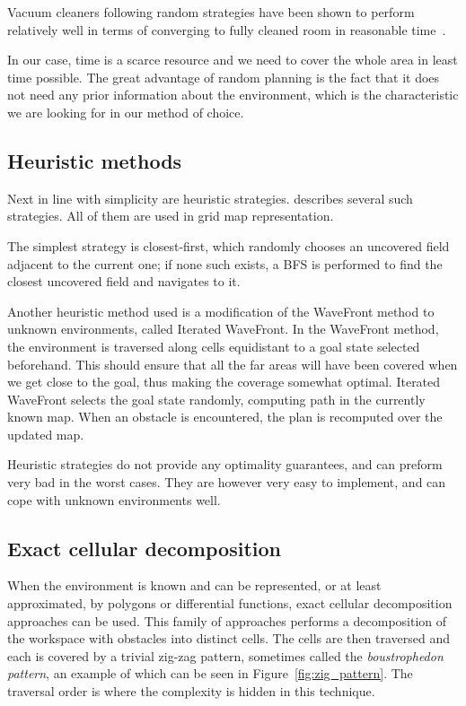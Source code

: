 \documentclass[buriama8_dp.tex]{subfiles}
\begin{document}
Vacuum cleaners following random strategies have been shown to perform relatively well in terms of converging to fully cleaned room in reasonable time~\cite{randomcover}.

In our case, time is a scarce resource and we need to cover the whole area in least time possible. The great advantage of random planning is the fact that it does not need any prior information about the environment, which is the characteristic we are looking for in our method of choice.

\subsection{Heuristic methods}
\label{subsec:heuritic}
Next in line with simplicity are heuristic strategies. \cite{rt_heuristic_coverage} describes several such strategies. All of them are used in grid map representation.

The simplest strategy is closest-first, which randomly chooses an uncovered field adjacent to the current one; if none such exists, a BFS is performed to find the closest uncovered field and navigates to it.

Another heuristic method used is a modification of the WaveFront method \cite{wavefront} to unknown environments, called Iterated WaveFront. In the WaveFront method, the environment is traversed along cells equidistant to a goal state selected beforehand. This should ensure that all the far areas will have been covered when we get close to the goal, thus making the coverage somewhat optimal. Iterated WaveFront selects the goal state randomly, computing path in the currently known map. When an obstacle is encountered, the plan is recomputed over the updated map.

Heuristic strategies do not provide any optimality guarantees, and can preform very bad in the worst cases. They are however very easy to implement, and can cope with unknown environments well. 

\subsection{Exact cellular decomposition}
\label{subsec:label}
When the environment is known and can be represented, or at least approximated, by polygons or differential functions, exact cellular decomposition approaches can be used. This family of approaches performs a decomposition of the workspace with obstacles into distinct cells. The cells are then traversed and each is covered by a trivial zig-zag pattern, sometimes called the \textit{boustrophedon pattern}, an example of which can be seen in Figure~\ref{fig:zig_pattern}. The traversal order is where the complexity is hidden in this technique.
\end{document}
